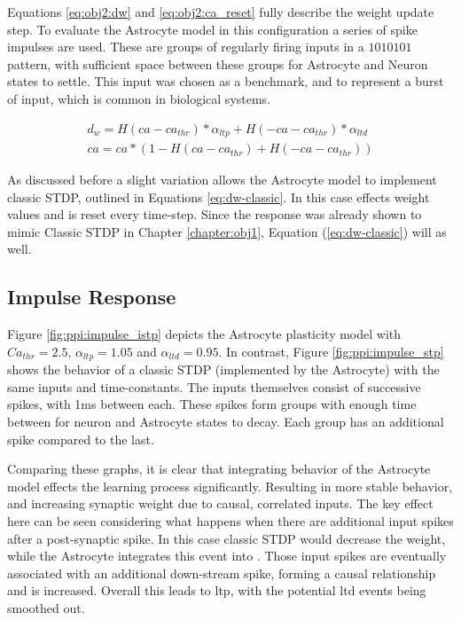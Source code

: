 Equations \ref{eq:obj2:dw} and \ref{eq:obj2:ca_reset} fully
describe the weight update step. To evaluate the Astrocyte
model in this configuration a series of spike impulses are used. These are
groups of regularly firing inputs in a $1010101$ pattern, with sufficient space
between these groups for Astrocyte and Neuron states to settle. This input was
chosen as a benchmark, and to represent a burst of input, which is common in
biological systems.

\begin{align}
  d_w = H(ca - ca_{thr}) * \alpha_{ltp} + H(-ca - ca_{thr}) *
  \alpha_{ltd} \label{eq:obj2:dw} \\
  ca = ca * (1 - H(ca - ca_{thr}) +  H(-ca - ca_{thr})) \label{eq:obj2:ca_reset}
\end{align}

As discussed before a slight variation allows the Astrocyte model to implement
classic STDP, outlined in Equations \ref{eq:dw-classic}. In this case \ca
effects weight values and is reset every time-step. Since the \ca response was
already shown to mimic Classic STDP in Chapter \ref{chapter:obj1}, Equation
(\ref{eq:dw-classic}) will as well.

\subsection{Impulse Response}
Figure \ref{fig:ppi:impulse_istp} depicts the Astrocyte plasticity model with
$Ca_{thr}=2.5$, $\alpha_{ltp}=1.05$ and $\alpha_{ltd}=0.95$. In contrast, Figure
\ref{fig:ppi:impulse_stp} shows the behavior of a classic STDP (implemented by
the Astrocyte) with the same inputs and time-constants. The inputs themselves
consist of successive spikes, with 1ms between each. These spikes form groups
with enough time between for neuron and Astrocyte states to decay. Each group
has an additional spike compared to the last.

Comparing these graphs, it is clear that integrating
behavior of the Astrocyte model effects the learning process
significantly. Resulting in more stable behavior, and increasing synaptic weight
due to causal, correlated inputs. The key effect here can be seen considering
what happens when there are additional input spikes after a post-synaptic
spike. In this case classic STDP would decrease the weight, while the Astrocyte
integrates this event into \ca. Those input spikes are eventually associated
with an additional down-stream spike, forming a causal relationship and \ca is
increased. Overall this leads to \Gls{ltp}, with the potential \Gls{ltd} events being
smoothed out.

